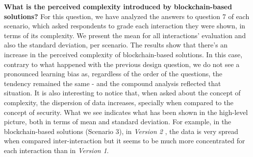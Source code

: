 \textbf{What is the perceived complexity introduced by blockchain-based solutions?} For this question, we have analyzed the answers to question 7 of each scenario, which asked respondents to grade each interaction they were shown, in terms of its complexity. We present the mean for all interactions' evaluation and also the standard deviation, per scenario. The results show that there's an increase in the perceived complexity of blockchain-based solutions. In this case, contrary to what happened with the previous design question, we do not see a pronounced learning bias as, regardless of the order of the questions, the tendency remained the same - and the compound analysis reflected that situation. It is also interesting to notice that, when asked about the concept of complexity, the dispersion of data increases, specially when compared to the concept of security. What we see indicates what has been shown in the high-level picture, both in terms of mean and standard deviation. For example, in the blockchain-based solutions (Scenario 3), in \textit{Version 2} , the data is very spread when compared inter-interaction but it seems to be much more concentrated for each interaction than in \textit{Version 1}.